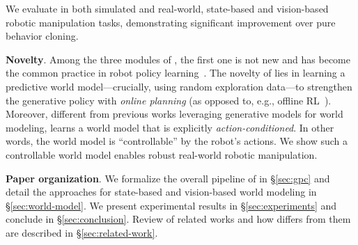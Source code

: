We evaluate \nameshort in both simulated and real-world, state-based and vision-based robotic manipulation tasks, demonstrating significant improvement over pure behavior cloning. 

\textbf{Novelty}. Among the three modules of \nameshort, the first one is not new and has become the common practice in robot policy learning~\cite{chi2023diffusion,urain2024deep}. The novelty of \nameshort lies in learning a predictive world model---crucially, using random exploration data---to strengthen the generative policy with \emph{online planning} (as opposed to, e.g., offline RL~\cite{hafner2020mastering,janner2022planning,wang2022diffusion,ding2024diffusion,nakamoto2024steering}). Moreover, different from previous works leveraging generative models for world modeling, \nameshort learns a world model that is explicitly \emph{action-conditioned}. In other words, the world model is ``controllable'' by the robot's actions. We show such a controllable world model enables robust real-world robotic manipulation.   

\textbf{Paper organization}. We formalize the overall pipeline of \nameshort in \S\ref{sec:gpc} and detail the approaches for state-based and vision-based world modeling in \S\ref{sec:world-model}. We present experimental results in \S\ref{sec:experiments} and conclude in \S\ref{sec:conclusion}. Review of related works and how \nameshort differs from them are described in \S\ref{sec:related-work}.









